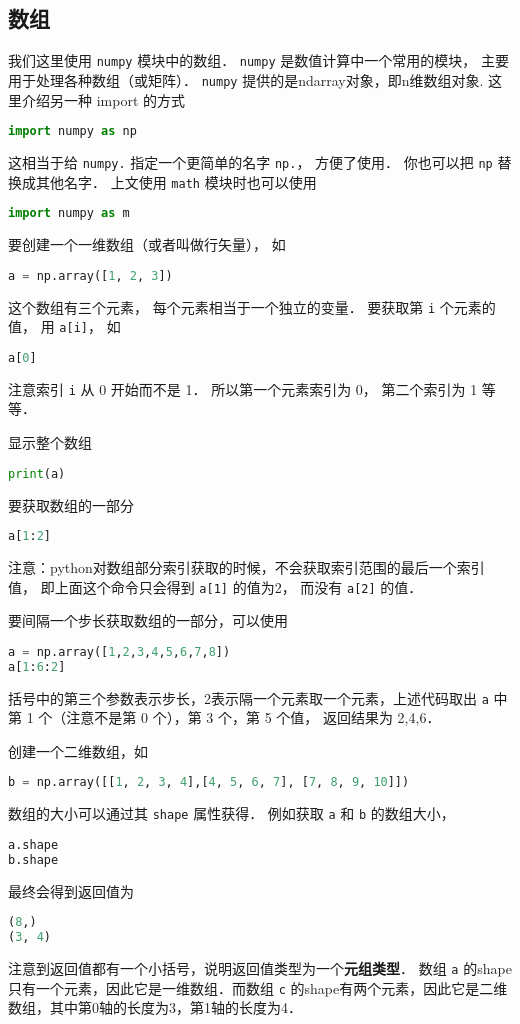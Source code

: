 
\subsection{数组}
我们这里使用 \verb|numpy| 模块中的数组． \verb|numpy| 是数值计算中一个常用的模块， 主要用于处理各种数组（或矩阵）． \verb|numpy| 提供的是ndarray对象，即n维数组对象. 这里介绍另一种 import 的方式
\begin{lstlisting}[language=python]
import numpy as np
\end{lstlisting}
这相当于给 \verb|numpy.| 指定一个更简单的名字 \verb|np.|， 方便了使用． 你也可以把 \verb|np| 替换成其他名字． 上文使用 \verb|math| 模块时也可以使用
\begin{lstlisting}[language=python]
import numpy as m
\end{lstlisting}

要创建一个一维数组（或者叫做行矢量）， 如
\begin{lstlisting}[language=python]
a = np.array([1, 2, 3])
\end{lstlisting}
这个数组有三个元素， 每个元素相当于一个独立的变量． 要获取第 \verb|i| 个元素的值， 用 \verb|a[i]|， 如
\begin{lstlisting}[language=python]
a[0]
\end{lstlisting}
注意索引 \verb|i| 从 0 开始而不是 1． 所以第一个元素索引为 0， 第二个索引为 1 等等．

显示整个数组
\begin{lstlisting}[language=python]
print(a)
\end{lstlisting}
要获取数组的一部分
\begin{lstlisting}[language=python]
a[1:2]
\end{lstlisting}
注意：python对数组部分索引获取的时候，不会获取索引范围的最后一个索引值， 即上面这个命令只会得到 \verb|a[1]| 的值为2， 而没有 \verb|a[2]| 的值．

要间隔一个步长获取数组的一部分，可以使用
\begin{lstlisting}[language=python]
a = np.array([1,2,3,4,5,6,7,8])
a[1:6:2]
\end{lstlisting}
括号中的第三个参数表示步长，2表示隔一个元素取一个元素，上述代码取出 \verb|a| 中第 1 个（注意不是第 0 个），第  3 个，第 5 个值， 返回结果为 2,4,6．

创建一个二维数组，如
\begin{lstlisting}[language=python]
b = np.array([[1, 2, 3, 4],[4, 5, 6, 7], [7, 8, 9, 10]])
\end{lstlisting}
数组的大小可以通过其 \verb|shape| 属性获得． 例如获取 \verb|a| 和 \verb|b| 的数组大小，
\begin{lstlisting}[language=python]
a.shape
b.shape
\end{lstlisting}
最终会得到返回值为
\begin{lstlisting}[language=python]
(8,)
(3, 4)
\end{lstlisting}
注意到返回值都有一个小括号，说明返回值类型为一个\textbf{元组类型}． 数组 \verb|a| 的shape只有一个元素，因此它是一维数组．而数组 \verb|c| 的shape有两个元素，因此它是二维数组，其中第0轴的长度为3，第1轴的长度为4．


